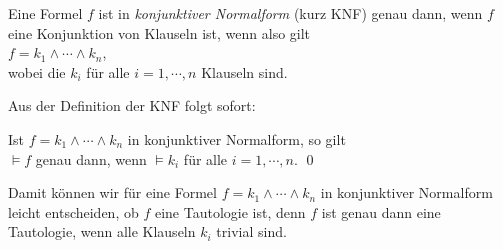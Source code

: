 \begin{Definition}  
  Eine Formel $f$ ist in \emph{konjunktiver Normalform} (kurz KNF)
  genau dann, wenn $f$ eine Konjunktion von Klauseln ist, wenn also gilt \\[0.2cm]
  \hspace*{1.3cm} $f = k_1 \wedge \cdots \wedge k_n$, \\[0.2cm]
  wobei die $k_i$ f\"{u}r alle $i=1,\cdots,n$ Klauseln sind. \eox
\end{Definition}

\noindent
Aus der Definition der KNF folgt sofort:
\begin{Korollar} \label{korollar:knf}
  Ist $f = k_1 \wedge \cdots \wedge k_n$ in konjunktiver Normalform, so gilt\\[0.2cm]
  \hspace*{1.3cm} $\models f$ \quad genau dann, wenn \quad $\models k_i$ \quad f\"{u}r alle $i=1,\cdots,n$. \qed
\end{Korollar}

Damit k\"{o}nnen wir f\"{u}r eine Formel $f = k_1 \wedge \cdots \wedge k_n$ in konjunktiver
Normalform leicht entscheiden, ob $f$ eine Tautologie ist, denn $f$ ist genau dann eine
Tautologie, wenn alle Klauseln $k_i$ trivial sind.
\vspace*{0.2cm}

